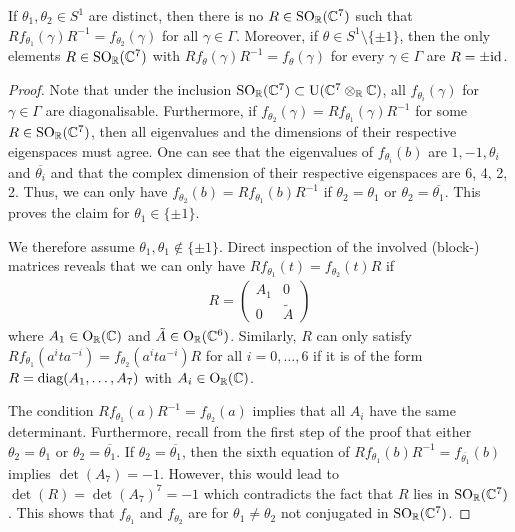 \documentclass[11pt,a4paper]{scrartcl}
\newcommand{\id}{\textup{id}}
\newcommand{\SO}{\textup{SO}}
\renewcommand{\O}{\textup{O}}
\newcommand{\U}{\textup{U}}
\numberwithin{equation}{section}
\theoremstyle{plain}
\theoremstyle{definition}
\theoremstyle{remark}
\begin{document}
\begin{proposition}\label{prop:example18-monodromies-not-conjugated}
If $\theta_1,\theta_2 \in S^1$ are distinct, then there is no $R \in \SO_\mathbb{R}(\mathbb{C}^7)$ such that $R f_{\theta_1}(\gamma) R^{-1} = f_{\theta_2}(\gamma)$ for all $\gamma\in \Gamma$. Moreover, if $\theta \in S^1 \setminus \{\pm 1 \} $, then the only elements $R\in \SO_\mathbb{R}(\mathbb{C}^7)$ with $Rf_{\theta}(\gamma) R^{-1} =f_{\theta} (\gamma)$ for every $\gamma \in \Gamma$ are $R = \pm \id$.
\end{proposition}
\begin{proof}
Note that under the inclusion $\SO_\mathbb{R}(\mathbb{C}^7) \subset \U(\mathbb{C}^7\otimes_\mathbb{R}\mathbb{C})$, all $f_{\theta_i}(\gamma)$ for $\gamma\in \Gamma$ are diagonalisable. Furthermore, if $f_{\theta_2}(\gamma) = R f_{\theta_1}(\gamma) R^{-1}$ for some $R\in \SO_\mathbb{R}(\mathbb{C}^7)$, then all eigenvalues and the dimensions of their respective eigenspaces must agree. One can see that the eigenvalues of $f_{\theta_i}(b)$ are $1,-1,\theta_i$ and $\overline{\theta_i}$ and that the complex dimension of their respective eigenspaces are 6, 4, 2, 2. Thus, we can only have $f_{\theta_2}(b) = R f_{\theta_1}(b) R^{-1}$ if $\theta_2 = \theta_1$ or $\theta_2 = \overline{\theta_1}$. This proves the claim for $\theta_1 \in \{\pm1\}$.

We therefore assume $\theta_1, \theta_1 \notin \{\pm 1\}$. Direct inspection of the involved (block-) matrices reveals that we can only have $Rf_{\theta_1}(t) = f_{\theta_2}(t)R$ if 
\begin{align*}
R = \begin{pmatrix}
A_1 & 0 \\
0 & \tilde{A}
\end{pmatrix}
\end{align*}
where $A_1 \in \O_{\mathbb{R}}(\mathbb{C})$ and $\tilde{A}\in \O_{\mathbb{R}}(\mathbb{C}^6)$. Similarly, $R$ can only satisfy $R f_{\theta_1}(a^ita^{-i}) = f_{\theta_2}(a^ita^{-i}) R$ for all $i=0,\dots,6$ if it is of the form $R = \textup{diag}(A_1,\dots,A_7)$ with $A_i \in \O_{\mathbb{R}}(\mathbb{C})$.

The condition $R f_{\theta_1}(a) R^{-1} = f_{
\theta_2}(a)$ implies that all $A_i$ have the same determinant. Furthermore, recall from the first step of the proof that either $\theta_2=\theta_1$ or $\theta_2= \overline{\theta_1}$. If $\theta_2= \overline{\theta_1}$, then the sixth equation of $R f_{\theta_1}(b) R^{-1}  =f_{\overline{\theta_1}}(b)$ implies $\det(A_7)=-1$. However, this would lead to $\det(R) = \det(A_7)^7=-1$ which contradicts the fact that $R$ lies in $\SO_\mathbb{R}(\mathbb{C}^7)$. This shows that $f_{\theta_1}$ and $f_{\theta_2}$ are for $\theta_1 \neq \theta_2$ not conjugated in $\SO_\mathbb{R}(\mathbb{C}^7)$.


\end{proof}
\end{document}
